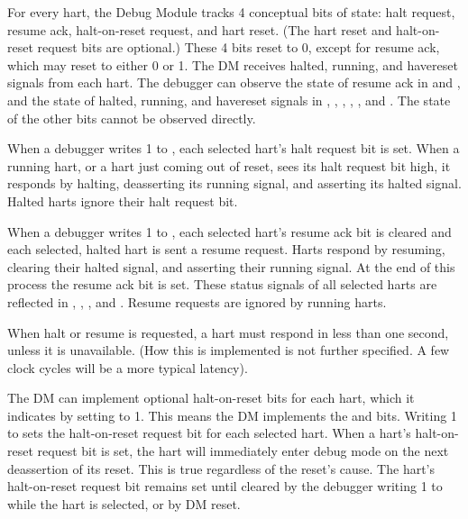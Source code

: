 For every hart, the Debug Module tracks 4 conceptual bits of state: halt
request, resume ack, halt-on-reset request,  and hart reset.
(The hart reset and halt-on-reset request bits are optional.)
These 4 bits reset to 0, except for resume ack, which may reset to either 0 or 1.
The DM receives halted, running, and havereset signals from each hart.
The debugger can observe the state of resume ack in \FdmDmstatusAllresumeack and
\FdmDmstatusAnyresumeack, and the state of halted, running, and havereset signals
in \FdmDmstatusAllhalted, \FdmDmstatusAnyhalted, \FdmDmstatusAllrunning, \FdmDmstatusAnyrunning, \FdmDmstatusAllhavereset,
and \FdmDmstatusAnyhavereset. The state of the other bits cannot be observed directly.

When a debugger writes 1 to \FdmDmcontrolHaltreq, each selected hart's halt request bit is
set.
When a running hart, or a hart just coming out of reset, sees its halt request
bit high, it responds by halting, deasserting its running signal, and asserting
its halted signal.
Halted harts ignore their halt request bit.

When a debugger writes 1 to \FdmDmcontrolResumereq, each selected hart's resume ack bit is
cleared and each selected, halted hart is sent a resume request. Harts respond
by resuming, clearing their halted signal, and asserting their running signal.
At the end of this process the resume ack bit is set.  These
status signals of all selected harts are reflected in \FdmDmstatusAllresumeack,
\FdmDmstatusAnyresumeack, \FdmDmstatusAllrunning, and \FdmDmstatusAnyrunning. Resume requests are ignored by
running harts.

When halt or resume is requested, a hart must respond in
less than one second, unless it is unavailable.
(How this is implemented is not further specified. A few
clock cycles will be a more typical latency).

The DM can implement optional halt-on-reset bits for each hart,
which it indicates by setting \FdmDmstatusHasresethaltreq to 1.
This means the DM implements the \FdmDmcontrolSetresethaltreq and \FdmDmcontrolClrresethaltreq bits.
Writing 1 to \FdmDmcontrolSetresethaltreq sets the halt-on-reset request bit for each
selected hart.
When a hart's halt-on-reset request bit is set, the hart will immediately enter
debug mode on the next deassertion of its reset. This is true regardless of
the reset's cause.
The hart's halt-on-reset request bit remains set
until cleared by the debugger writing 1 to \FdmDmcontrolClrresethaltreq
while the hart is selected, or by DM reset.

